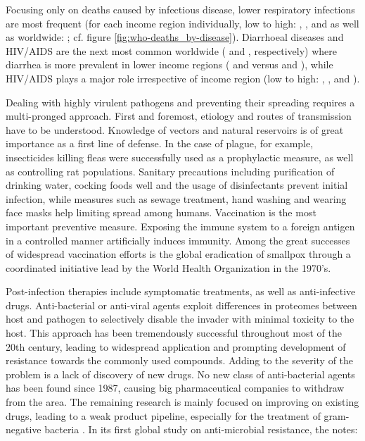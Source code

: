 

Focusing only on deaths caused by infectious disease, lower respiratory infections are most frequent (for each income region individually, low to high: \knitrPercentageInfectTwelveLowLRI{}, \knitrPercentageInfectTwelveLmidLRI{}, \knitrPercentageInfectTwelveUmidLRI{} and \knitrPercentageInfectTwelveHighLRI{} as well as worldwide: \knitrPercentageInfectTwelveWorldLRI{}; cf. figure \ref{fig:who-deaths_by-disease}). Diarrhoeal diseases and HIV/AIDS are the next most common worldwide (\knitrPercentageInfectTwelveWorldDiarr{} and \knitrPercentageInfectTwelveWorldAIDS{}, respectively) where diarrhea is more prevalent in lower income regions (\knitrPercentageInfectTwelveLowDiarr{} and \knitrPercentageInfectTwelveLmidDiarr{} versus \knitrPercentageInfectTwelveUmidDiarr{} and \knitrPercentageInfectTwelveHighDiarr{}), while HIV/AIDS plays a major role irrespective of income region (low to high: \knitrPercentageInfectTwelveLowAIDS{}, \knitrPercentageInfectTwelveLmidAIDS{}, \knitrPercentageInfectTwelveUmidAIDS{} and \knitrPercentageInfectTwelveHighAIDS{}).

Dealing with highly virulent pathogens and preventing their spreading requires a multi-pronged approach. First and foremost, etiology and routes of transmission have to be understood. Knowledge of vectors and natural reservoirs is of great importance as a first line of defense. In the case of plague, for example, insecticides killing fleas were successfully used as a prophylactic measure, as well as controlling rat populations. Sanitary precautions including purification of drinking water, cocking foods well and the usage of disinfectants prevent initial infection, while measures such as sewage treatment, hand washing and wearing face masks help limiting spread among humans. Vaccination is the most important preventive measure. Exposing the immune system to a foreign antigen in a controlled manner artificially induces immunity. Among the great successes of widespread vaccination efforts is the global eradication of smallpox through a coordinated initiative lead by the World Health Organization in the 1970's.

Post-infection therapies include symptomatic treatments, as well as anti-infective drugs. Anti-bacterial or anti-viral agents exploit differences in proteomes between host and pathogen to selectively disable the invader with minimal toxicity to the host. This approach has been tremendously successful throughout most of the 20th century, leading to widespread application and prompting development of resistance towards the commonly used compounds. Adding to the severity of the problem is a lack of discovery of new drugs. No new class of anti-bacterial agents has been found since 1987, causing big pharmaceutical companies to withdraw from the area. The remaining research is mainly focused on improving on existing drugs, leading to a weak product pipeline, especially for the treatment of gram-negative bacteria \citep{Silver2011}. In its first global study on anti-microbial resistance, the \cite{WHO2014} notes:

